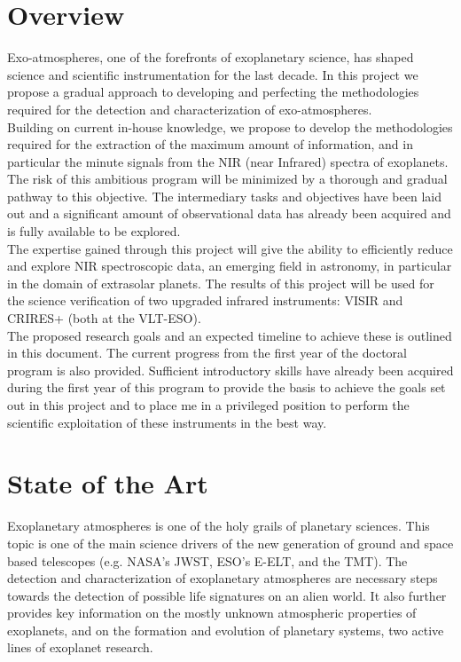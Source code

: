 \documentclass[pdftex,12pt,a4paper]{article}
\begin{document}


\tableofcontents

\newpage
\section{Overview}
Exo-atmospheres, one of the forefronts of exoplanetary science, has shaped science and scientific instrumentation for the last decade. In this project we propose a gradual approach to developing and perfecting the methodologies required for the detection and characterization of exo-atmospheres.\\

Building on current in-house knowledge, we propose to develop the methodologies required for the extraction of the maximum amount of information, and in particular the minute signals from the NIR (near Infrared) spectra of exoplanets. The risk of this ambitious program will be minimized by a thorough and gradual pathway to this objective. The intermediary tasks and objectives have been laid out and a significant amount of observational data has already been acquired and is fully available to be explored.\\

The expertise gained through this project will give the ability to efficiently reduce and explore NIR spectroscopic data, an emerging field in astronomy, in particular in the domain of extrasolar planets. The results of this project will be used for the science verification of two upgraded infrared instruments: VISIR and CRIRES+ (both at the VLT-ESO).\\

The proposed research goals and an expected timeline to achieve these is outlined in this document. The current progress from the first year of the doctoral program is also provided. Sufficient introductory skills have already been acquired during the first year of this program to provide the basis to achieve the goals set out in this project and to place me in a privileged position to perform the scientific exploitation of these instruments in the best way. \\

\newpage
\section{State of the Art}

Exoplanetary atmospheres is one of the holy grails of planetary sciences. This topic is one of the main science drivers of the new generation of ground and space based telescopes (e.g. NASA's JWST, ESO's E-ELT, and the TMT). The detection and characterization of exoplanetary atmospheres are necessary steps towards the detection of possible life signatures on an alien world. It also further provides key information on the mostly unknown atmospheric properties of exoplanets, and on the formation and evolution of planetary systems, two active lines of exoplanet research.\\
\end{document}
